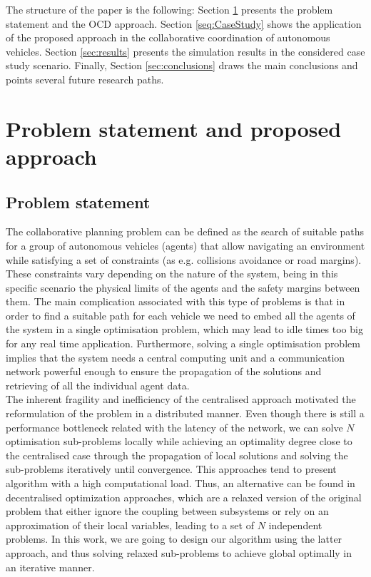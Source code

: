 \documentclass[letterpaper, 10 pt, conference]{ieeeconf}  %
\begin{document}
The structure of the paper is the following: Section \ref{sec:statement} presents the problem statement and the OCD approach. Section \ref{seq:CaseStudy} shows the application of the proposed approach in the collaborative coordination of autonomous vehicles. Section \ref{sec:results} presents the simulation results in the considered case study scenario. Finally, Section \ref{sec:conclusions} draws the main conclusions and points several future research paths.

\section{Problem statement and proposed approach} \label{sec:statement}
\label{Sec:MA optimal plans}
\subsection{Problem statement}
The collaborative planning problem can be defined as the search of suitable paths for a group of autonomous vehicles (agents) that allow navigating an environment while satisfying a set of constraints (as e.g. collisions avoidance or road margins). These constraints vary depending on the nature of the system, being in this specific scenario the physical limits of the agents and the safety margins between them. The main complication associated with this type of problems is that in order to find a suitable path for each vehicle we need to embed all the agents of the system in a single optimisation problem, which may lead to idle times too big for any real time application. Furthermore, solving a single optimisation problem implies that the system needs a central computing unit and a communication network powerful enough to ensure the propagation of the solutions and retrieving of all the individual agent data.\\ 

The inherent fragility and inefficiency of the centralised approach motivated the reformulation of the problem in a distributed manner. Even though there is still a performance bottleneck related with the latency of the network, we can solve $N$ optimisation sub-problems locally while achieving an optimality degree close to the centralised case through the propagation of local solutions and solving the sub-problems iteratively until convergence. This approaches tend to present algorithm with a high computational load. Thus, an alternative can be found in decentralised optimization approaches, which are a relaxed version of the original problem that either ignore the coupling between subsystems or rely on an approximation of their local variables, leading to a set of $N$ independent problems. In this work, we are going to design our algorithm using the latter approach, and thus solving relaxed sub-problems to achieve global optimally in an iterative manner.
\end{document}
